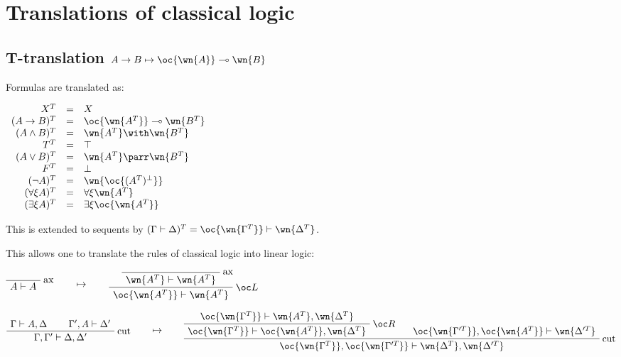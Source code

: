 \chapter{Translations of classical logic}\label{translations-of-classical-logic}

\section{\texorpdfstring{T-translation \(A\imp B \mapsto \oc{\wn{A}}\limp\wn{B}\)}{T-translation A\textbackslash{}imp B \textbackslash{}mapsto \textbackslash{}oc\{\textbackslash{}wn\{A\}\}\textbackslash{}limp\textbackslash{}wn\{B\}}}\label{t-translation-aimp-b-mapsto-ocwnalimpwnb}

Formulas are translated as:

\(\begin{array}{rcl}
X^T &  = &  X \\
(A\imp B)^T &  = &  \oc{\wn{A^T}}\limp\wn{B^T} \\
(A\wedge B)^T &  = &  \wn{A^T} \with \wn{B^T} \\
T^T &  = &  \top \\
(A\vee B)^T &  = &  \wn{A^T}\parr\wn{B^T} \\
F^T &  = &  \bot \\
(\neg A)^T &  = &  \wn{\oc{(A^T)\orth}} \\
(\forall\xi A)^T &  = &  \forall\xi \wn{A^T} \\
(\exists\xi A)^T &  = &  \exists\xi \oc{\wn{A^T}}
\end{array}\)

This is extended to sequents by
\((\Gamma\vdash\Delta)^T = \oc{\wn{\Gamma^T}}\vdash\wn{\Delta^T}\).

This allows one to translate the rules of classical logic into linear
logic:

\(\LabelRule{\rulename{ax}}
\NulRule{A\vdash A}
\DisplayProof
\qquad\mapsto\qquad
\LabelRule{\rulename{ax}}
\NulRule{\wn{A^T}\vdash\wn{A^T}}
\LabelRule{\oc L}
\UnaRule{\oc{\wn{A^T}}\vdash\wn{A^T}}
\DisplayProof\)

\(\AxRule{\Gamma\vdash A,\Delta}
\AxRule{\Gamma',A\vdash\Delta'}
\LabelRule{\rulename{cut}}
\BinRule{\Gamma,\Gamma'\vdash\Delta,\Delta'}
\DisplayProof
\qquad\mapsto\qquad
\AxRule{\oc{\wn{\Gamma^T}}\vdash\wn{A^T},\wn{\Delta^T}}
\LabelRule{\oc R}
\UnaRule{\oc{\wn{\Gamma^T}}\vdash\oc{\wn{A^T}},\wn{\Delta^T}}
\AxRule{\oc{\wn{\Gamma'^T}},\oc{\wn{A^T}}\vdash\wn{\Delta'^T}}
\LabelRule{\rulename{cut}}
\BinRule{\oc{\wn{\Gamma^T}},\oc{\wn{\Gamma'^T}}\vdash\wn{\Delta^T},\wn{\Delta'^T}}
\DisplayProof\)

